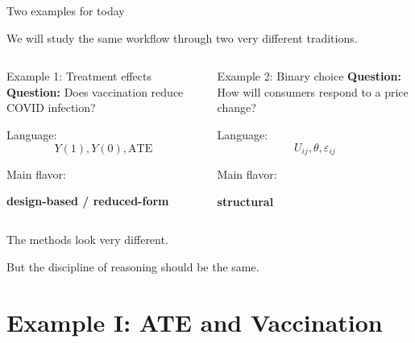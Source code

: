 \documentclass[aspectratio=169,11pt]{beamer}
\newcommand{\ATE}{\mathrm{ATE}}
\begin{document}
\begin{frame}{Two examples for today}

We will study the same workflow through two very different traditions.

\vspace{0.5em}

\begin{columns}[T]


\begin{block}{Example 1: Treatment effects}
\textbf{Question:}
Does vaccination reduce COVID infection?

\vspace{0.25em}

Language:
\[
Y(1),Y(0),\ATE
\]

Main flavor:

\begin{center}
\textbf{design-based / reduced-form}
\end{center}

\end{block}


\begin{block}{Example 2: Binary choice}
\textbf{Question:}
How will consumers respond to a price change?

\vspace{0.25em}

Language:
\[
U_{ij},\theta,\varepsilon_{ij}
\]

Main flavor:

\begin{center}
\textbf{structural}
\end{center}

\end{block}

\end{columns}

\vspace{0.4em}

The methods look very different.

\pause

But the discipline of reasoning should be the same.

\end{frame}

\section{Example I: ATE and Vaccination}
\end{document}
